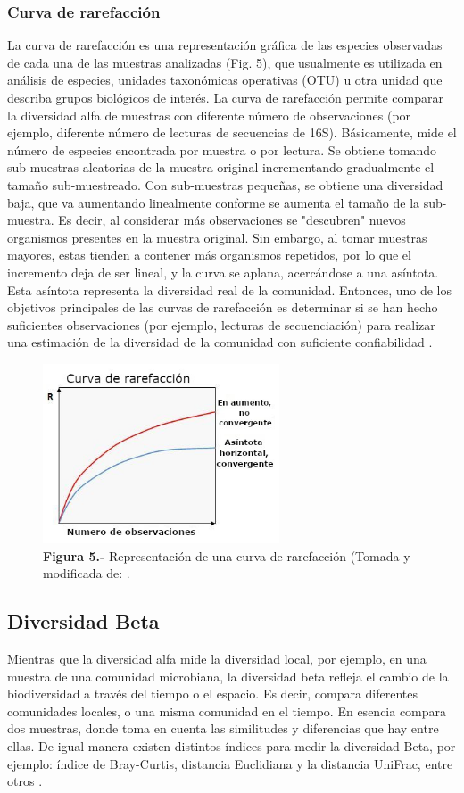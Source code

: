 \documentclass[12pt,letterpaper,oneside]{report}
\begin{document}
\subsubsection{Curva de rarefacción}
La curva de rarefacción es una representación gráfica de las especies observadas de cada una de las muestras analizadas (Fig. 5), que usualmente es utilizada en análisis de especies, unidades taxonómicas operativas (OTU) u otra unidad que describa grupos biológicos de interés. La curva de rarefacción permite comparar la diversidad alfa de muestras con diferente número de observaciones (por ejemplo, diferente número de lecturas de secuencias de 16S). Básicamente, mide el número de especies encontrada por muestra o por lectura. Se obtiene tomando sub-muestras aleatorias de la muestra original incrementando gradualmente el tamaño sub-muestreado. Con sub-muestras pequeñas, se obtiene una diversidad baja, que va aumentando linealmente conforme se aumenta el tamaño de la sub-muestra. Es decir, al considerar más observaciones se "descubren" nuevos organismos presentes en la muestra original. Sin embargo, al tomar muestras mayores, estas tienden a contener más organismos repetidos, por lo que el incremento deja de ser lineal, y la curva se aplana, acercándose a una asíntota. Esta asíntota representa la diversidad real de la comunidad. Entonces, uno de los objetivos principales de las curvas de rarefacción es determinar si se han hecho suficientes observaciones (por ejemplo, lecturas de secuenciación) para realizar una estimación de la diversidad de la comunidad con suficiente confiabilidad \autocite{Siegel2006}.
\begin{figure}[h]
\centering
\includegraphics[width=7cm]{figuras/IMG_5}
\caption*{\textbf{Figura 5.-} Representación de una curva de rarefacción (Tomada y modificada de: \cite{Edgar2018}.}
\label{Figura 5}
\end{figure}
\subsection{Diversidad Beta}
Mientras que la diversidad alfa mide la diversidad local, por ejemplo, en una muestra de una comunidad microbiana, la diversidad beta refleja el cambio de la biodiversidad a través del tiempo o el espacio. Es decir, compara diferentes comunidades locales, o una misma comunidad en el tiempo. En esencia compara dos muestras, donde toma en cuenta las similitudes y diferencias que hay entre ellas. De igual manera existen distintos índices para medir la diversidad Beta, por ejemplo: índice de Bray-Curtis, distancia Euclidiana y la distancia UniFrac, entre otros \autocite{Tuomisto2010a}.
\end{document}
